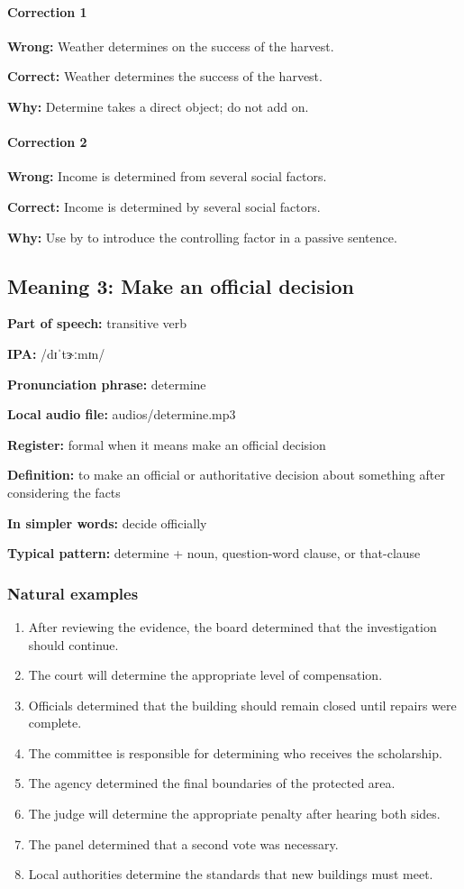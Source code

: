 \documentclass[11pt]{article}
\begin{document}
\paragraph{Correction 1}
\textbf{Wrong:} Weather determines on the success of the harvest.

\textbf{Correct:} Weather determines the success of the harvest.

\textbf{Why:} Determine takes a direct object; do not add on.

\paragraph{Correction 2}
\textbf{Wrong:} Income is determined from several social factors.

\textbf{Correct:} Income is determined by several social factors.

\textbf{Why:} Use by to introduce the controlling factor in a passive sentence.

\subsection{Meaning 3: Make an official decision}
\textbf{Part of speech:} transitive verb

\textbf{IPA:} /dɪˈtɝːmɪn/

\textbf{Pronunciation phrase:} determine

\textbf{Local audio file:} audios/determine.mp3

\textbf{Register:} formal when it means make an official decision

\textbf{Definition:} to make an official or authoritative decision about something after considering the facts

\textbf{In simpler words:} decide officially

\textbf{Typical pattern:} determine + noun, question-word clause, or that-clause

\subsubsection{Natural examples}
\begin{enumerate}
  \item After reviewing the evidence, the board determined that the investigation should continue.
  \item The court will determine the appropriate level of compensation.
  \item Officials determined that the building should remain closed until repairs were complete.
  \item The committee is responsible for determining who receives the scholarship.
  \item The agency determined the final boundaries of the protected area.
  \item The judge will determine the appropriate penalty after hearing both sides.
  \item The panel determined that a second vote was necessary.
  \item Local authorities determine the standards that new buildings must meet.
\end{enumerate}
\end{document}
